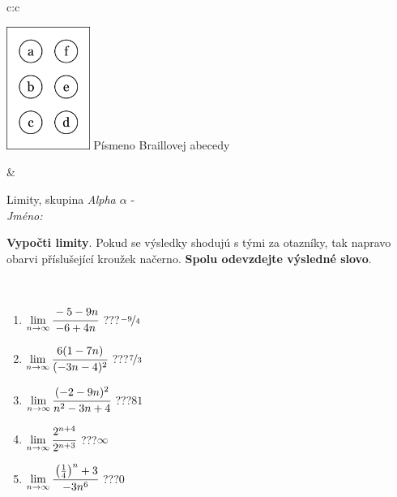 \documentclass[10pt]{report}
\begin{document}
\begin{tabular}{c:c}
\begin{minipage}[c][104.5mm][t]{0.5\linewidth}
\begin{center}
\begin{minipage}{0.20\linewidth}
\begin{center}
\includegraphics[height=40mm]{../images/braille.png}
{\small Písmeno Braillovej abecedy}
\end{center}
\end{minipage}
\end{center}
\end{minipage}
&
\begin{minipage}[c][104.5mm][t]{0.5\linewidth}
\begin{center}
\vspace{7mm}
{\huge Limity, skupina \textit{Alpha $\alpha$} -}\\[5mm]
\textit{Jméno:}\phantom{xxxxxxxxxxxxxxxxxxxxxxxxxxxxxxxxxxxxxxxxxxxxxxxxxxxxxxxxxxxxxxxxx}\\[5mm]
\begin{minipage}{0.95\linewidth}
\begin{center}
\textbf{Vypočti limity}. Pokud se výsledky shodujú s tými za otazníky, tak napravo\\obarvi příslušející kroužek načerno. \textbf{Spolu odevzdejte výsledné slovo}.
\end{center}
\end{minipage}
\\[1mm]
\begin{minipage}{0.79\linewidth}
\begin{center}
\begin{varwidth}{\linewidth}
\begin{enumerate}
\normalsize
\item $\lim\limits_{n\to\infty}\cfrac{-5-9n}{-6+4n}$\quad \dotfill\; ???\;\dotfill \quad $\nicefrac{-9}{4}$
\item $\lim\limits_{n\to\infty}\cfrac{6(1-7n)}{(-3n-4)^2}$\quad \dotfill\; ???\;\dotfill \quad $\nicefrac{7}{3}$
\item $\lim\limits_{n\to\infty}\cfrac{(-2-9n)^2}{n^2-3n+4}$\quad \dotfill\; ???\;\dotfill \quad $81$
\item $\lim\limits_{n\to\infty}\cfrac{2^{n+4}}{2^{n+3}}$\quad \dotfill\; ???\;\dotfill \quad $\infty$
\item $\lim\limits_{n\to\infty}\cfrac{\left(\frac{1}{4}\right)^n +3}{-3n^{6}}$\quad \dotfill\; ???\;\dotfill \quad $0$

\end{enumerate}
\end{varwidth}
\end{center}
\end{minipage}
\end{center}
\end{minipage}
\end{tabular}
\end{document}
